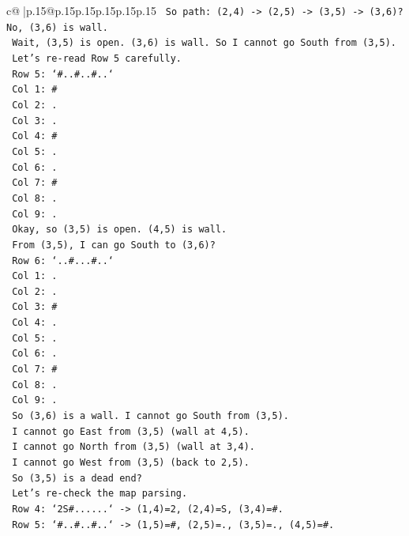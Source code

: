\documentclass{article}
\begin{document}
{\begin{supertabular}{c@{$\;$}|p{.15\linewidth}@{}p{.15\linewidth}p{.15\linewidth}p{.15\linewidth}p{.15\linewidth}p{.15\linewidth}}
{{{\texttt{   So path: (2,4) {-}> (2,5) {-}> (3,5) {-}> (3,6)? No, (3,6) is wall.} \\
\texttt{   Wait, (3,5) is open. (3,6) is wall. So I cannot go South from (3,5).} \\
\texttt{   Let's re{-}read Row 5 carefully.} \\
\texttt{   Row 5: `\#..\#..\#..`} \\
\texttt{   Col 1: \#} \\
\texttt{   Col 2: .} \\
\texttt{   Col 3: .} \\
\texttt{   Col 4: \#} \\
\texttt{   Col 5: .} \\
\texttt{   Col 6: .} \\
\texttt{   Col 7: \#} \\
\texttt{   Col 8: .} \\
\texttt{   Col 9: .} \\
\texttt{   Okay, so (3,5) is open. (4,5) is wall.} \\
\texttt{   From (3,5), I can go South to (3,6)?} \\
\texttt{   Row 6: `..\#...\#..`} \\
\texttt{   Col 1: .} \\
\texttt{   Col 2: .} \\
\texttt{   Col 3: \#} \\
\texttt{   Col 4: .} \\
\texttt{   Col 5: .} \\
\texttt{   Col 6: .} \\
\texttt{   Col 7: \#} \\
\texttt{   Col 8: .} \\
\texttt{   Col 9: .} \\
\texttt{   So (3,6) is a wall. I cannot go South from (3,5).} \\
\texttt{   I cannot go East from (3,5) (wall at 4,5).} \\
\texttt{   I cannot go North from (3,5) (wall at 3,4).} \\
\texttt{   I cannot go West from (3,5) (back to 2,5).} \\
\texttt{   So (3,5) is a dead end?} \\
\texttt{   Let's re{-}check the map parsing.} \\
\texttt{   Row 4: `2S\#......` {-}> (1,4)=2, (2,4)=S, (3,4)=\#.} \\
\texttt{   Row 5: `\#..\#..\#..` {-}> (1,5)=\#, (2,5)=., (3,5)=., (4,5)=\#.} \\
}}}
\end{supertabular}}
\end{document}

